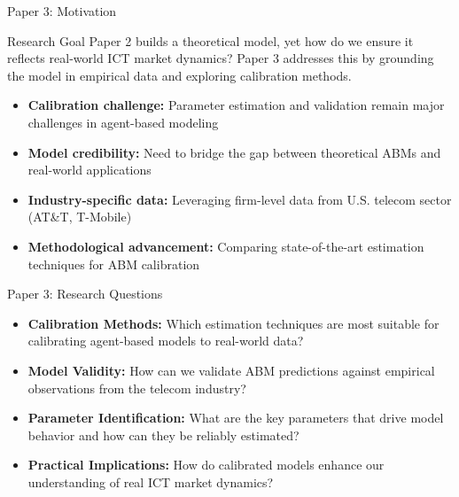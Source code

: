 \documentclass[10pt,aspectratio=169]{beamer}
\begin{document}
\begin{frame}{Paper 3: Motivation}
\begin{alertblock}{Research Goal}
Paper 2 builds a theoretical model, yet how do we ensure it reflects real-world ICT market dynamics? Paper 3 addresses this by grounding the model in empirical data and exploring calibration methods.
\end{alertblock}

\begin{itemize}
    \item \textbf{Calibration challenge:} Parameter estimation and validation remain major challenges in agent-based modeling
    
    \vspace{2mm}
    \item \textbf{Model credibility:} Need to bridge the gap between theoretical ABMs and real-world applications
    
    \vspace{2mm}
    \item \textbf{Industry-specific data:} Leveraging firm-level data from U.S. telecom sector (AT\&T, T-Mobile)
    
    \vspace{2mm}
    \item \textbf{Methodological advancement:} Comparing state-of-the-art estimation techniques for ABM calibration
\end{itemize}
\end{frame}

\begin{frame}{Paper 3: Research Questions}
\begin{itemize}
    \item \textbf{Calibration Methods:}  
    Which estimation techniques are most suitable for calibrating agent-based models to real-world data?

    \vspace{2mm}
    \item \textbf{Model Validity:}  
    How can we validate ABM predictions against empirical observations from the telecom industry?

    \vspace{2mm}
    \item \textbf{Parameter Identification:}  
    What are the key parameters that drive model behavior and how can they be reliably estimated?

    \vspace{2mm}
    \item \textbf{Practical Implications:}  
    How do calibrated models enhance our understanding of real ICT market dynamics?
\end{itemize}
\end{frame}
\end{document}
